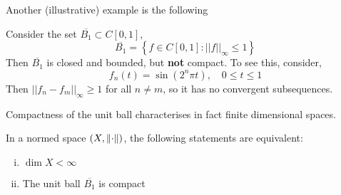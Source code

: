 \documentclass{article}
\begin{document}
Another (illustrative) example is the following  

\begin{example}
    Consider the set $\overline{B_1} \subset C[0,1]$,  
    \begin{equation*}
        \overline{B_1} = \left\{ f \in C[0,1] : ||f||_{\infty} \leq 1 \right\}
    \end{equation*}  
    Then $\overline{B_1}$ is closed and bounded, but \textbf{not} compact. To see this,
    consider,  
    \begin{equation*}
        f_n(t) = \sin(2^n \pi t), \quad 0 \leq t \leq 1
    \end{equation*}  
    Then $||f_n-f_m||_{\infty}\geq 1$ for all $n \neq m$, so it has no convergent subsequences. 
\end{example}

Compactness of the unit ball characterises in fact finite dimensional spaces.  

\begin{theorem}\nextline
    In a normed space $(X, \left\|{\cdot}\right\|)$, the following statements are equivalent:  
    \begin{enumerate}[i)]
        \item $\dim X < \infty$
        \item The unit ball $\overline{B_1}$ is compact 
    \end{enumerate}
\end{theorem}  
\end{document}

